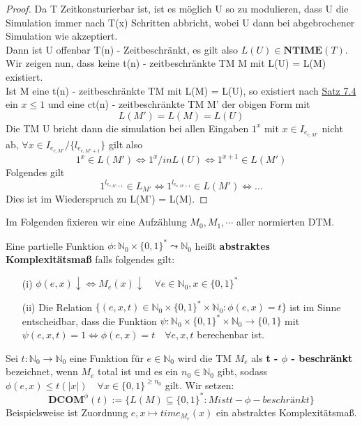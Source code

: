 \begin{proof}
        Da T Zeitkonsturierbar ist, ist es möglich U so zu modulieren, dass U die Simulation immer nach T(x) Schritten abbricht, wobei U dann bei abgebrochener Simulation wie akzeptiert.\\
        Dann ist U offenbar T(n) - Zeitbeschränkt, es gilt also \(L(U) \in \textbf{NTIME}(T)\).\\
        Wir zeigen nun, dass keine t(n) - zeitbeschränkte TM M mit L(U) = L(M) existiert.\\
        Ist M eine t(n) - zeitbeschränkte TM mit L(M) = L(U), so existiert nach \hyperref[subsec:7.4]{Satz 7.4} ein \(x \leq 1\) und eine ct(n) - zeitbeschränkte TM M' der obigen Form mit 
        \[
            L(M') = L(M) = L(U)
        \]
        Die TM U bricht dann die simulation bei allen Eingaben \(1^x\) mit \(x \in I_{e_{c, M'}}\) nicht ab, \(\forall x \in I_{e_{c, M'}} / \{l_{e_{c, M' +1}}\}\) gilt also 
        \[
            1^x \in L(M') \Leftrightarrow 1^x /in L(U) \Leftrightarrow 1^{x+1} \in L(M')
        \]
        Folgendes gilt 
        \[
            1^{l_{e_{c,M' + 1}}} \in L_{M'} \Leftrightarrow 1^{l_{e_{x, M' + 1}}} \in L(M') \Leftrightarrow ...
        \]
        Dies ist im Wiederspruch zu L(M') = L(M).
    \end{proof}
    Im Folgenden fixieren wir eine Aufzählung \(M_0, M_1, \cdots\) aller normierten DTM.

    Eine partielle Funktion \(\phi : \mathbb{N}_0 \times \{0, 1\}^* \leadsto \mathbb{N}_0\) heißt \textbf{abstraktes Komplexitätsmaß} falls folgendes gilt:
    \begin{itemize}
        \item [(i)] \(\phi(e,x) \downarrow \Leftrightarrow M_e(x) \downarrow \quad \forall e \in \mathbb{N}_0, x \in \{0, 1\}^*\)
        \item [(ii)] Die Relation \(\{(e, x, t) \in \mathbb{N}_0 \times \{0, 1\}^* \times \mathbb{N}_0 : \phi(e,x) = t\}\) ist im Sinne entscheidbar, dass die Funktion \(\psi : \mathbb{N}_0 \times \{0, 1\}^* \times \mathbb{N}_0 \to \{0, 1\}\) mit \(\psi(e, x, t) = 1 \Leftrightarrow \phi (e,x) = t \quad \forall e, x, t\) berechenbar ist.
    \end{itemize}

    Sei \(t: \mathbb{N}_0 \to \mathbb{N}_0\) eine Funktion für \(e \in \mathbb{N}_0\) wird die TM \(M_e\) als \textbf{t - \(\phi\) - beschränkt} bezeichnet, wenn \(M_e\) total ist und es ein \(n_0 \in \mathbb{N}_0\) gibt, sodass \(\phi(e, x) \leq t(|x|) \quad \forall x \in \{0, 1\}^{\geq n_0}\) gilt. Wir setzen:
    \[
        \textbf{DCOM}^{\phi}(t) := \{L(M) \subseteq \{0, 1\}^* : M ist t - \phi - beschränkt\}  
    \] 
    Beispielsweise ist Zuordnung \(e, x \mapsto time_{M_e} (x)\) ein abstraktes Komplexitätsmaß.

